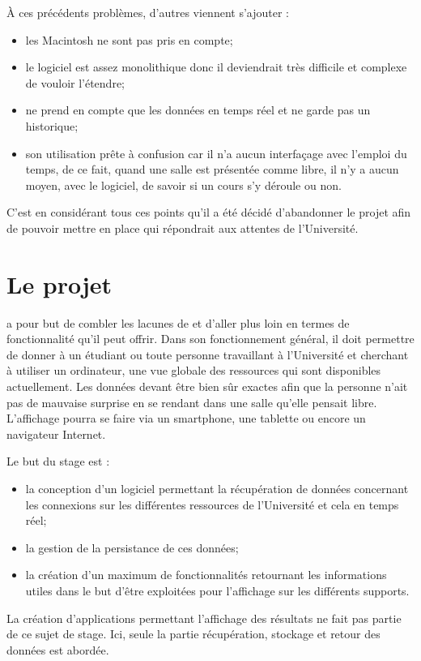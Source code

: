 \noindent \`A ces pr\'ec\'edents probl\`emes, d'autres viennent s'ajouter :

\begin{itemize}
	\item les Macintosh ne sont pas pris en compte;
	\item le logiciel est assez monolithique donc il deviendrait tr\`es difficile et complexe de vouloir l'\'etendre;
	\item {\Yuukou} ne prend en compte que les donn\'ees en temps r\'eel et ne garde pas un historique;
	\item son utilisation pr\^ete \`a confusion car il n'a aucun interfa\c{c}age avec l'emploi du temps, de ce fait, quand une salle est pr\'esent\'ee comme libre, il n'y a aucun moyen, avec le logiciel, de savoir si un cours s'y d\'eroule ou non.

\end{itemize}

\vspace{0.20cm}

C'est en consid\'erant tous ces points qu'il a \'et\'e d\'ecid\'e d'abandonner le projet \Yuukou{} afin de pouvoir mettre en place \YuukouII{} qui r\'epondrait aux attentes de l'Universit\'e.

\section{Le projet \YuukouII}


\YuukouII{} a pour but de combler les lacunes de \Yuukou{} et d'aller plus loin en termes de fonctionnalit\'e qu'il peut offrir. 
Dans son fonctionnement g\'en\'eral, il doit permettre de donner \`a un \'etudiant ou toute personne travaillant \`a l'Universit\'e et cherchant \`a utiliser un ordinateur, une vue globale des ressources qui sont disponibles actuellement.
Les donn\'ees devant \^etre bien s\^ur exactes afin que la personne n'ait pas de mauvaise surprise en se rendant dans une salle qu'elle pensait libre.
L'affichage pourra se faire via un smartphone, une tablette ou encore un navigateur Internet.

\noindent Le but du stage est : 

\begin{itemize}
	\item la conception d'un logiciel permettant la r\'ecup\'eration de donn\'ees concernant les connexions sur les diff\'erentes ressources de l'Universit\'e et cela en temps r\'eel;
	\item la gestion de la persistance de ces donn\'ees;
	\item la cr\'eation d'un maximum de fonctionnalit\'es retournant les informations utiles dans le but d'\^etre exploit\'ees pour l'affichage sur les diff\'erents supports.

\end{itemize} 

\vspace{0.20cm}

La cr\'eation d'applications permettant l'affichage des r\'esultats ne fait pas partie de ce sujet de stage. 
Ici, seule la partie r\'ecup\'eration, stockage et retour des donn\'ees est abord\'ee.

\clearpage
